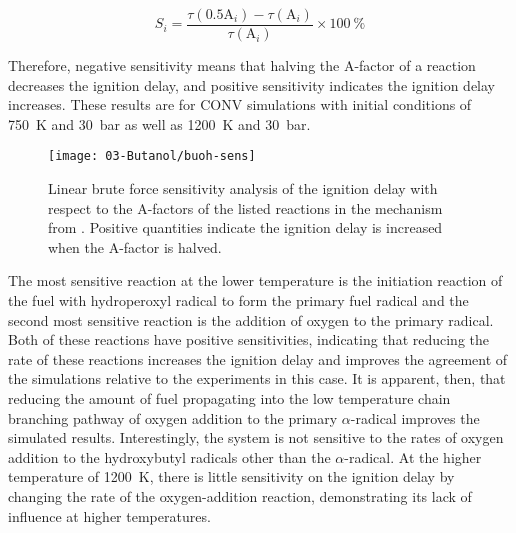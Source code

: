\documentclass[../main.tex]{subfiles}
\begin{document}
\begin{equation}
    \label{eq:buoh-sens}
    S_i=\frac{\tau(0.5\mathrm{A}_i )-\tau(\mathrm{A}_i )}{\tau(\mathrm{A}_i)} \times \SI{100}{\percent}
\end{equation}

Therefore, negative sensitivity means that halving the $\mathrm{A}$-factor of a reaction
decreases the ignition delay, and positive sensitivity indicates the ignition
delay increases. These results are for CONV simulations with initial conditions
of \SI{750}{\kelvin} and \SI{30}{\bar} as well as \SI{1200}{\kelvin} and \SI{30}{\bar}.

\begin{figure}
    \texttt{[image: 03-Butanol/buoh-sens]}
    \caption{Linear brute force sensitivity analysis of the ignition delay with
        respect to the A-factors of the listed reactions in the mechanism from
        \textcite{Sarathy2012}. Positive quantities indicate the ignition delay
        is increased when the $\mathrm{A}$-factor is halved.}
    \label{fig:buoh-sens}
\end{figure}

The most sensitive reaction at the lower temperature is the initiation reaction
of the fuel with hydroperoxyl radical to form the primary fuel radical and the
second most sensitive reaction is the addition of oxygen to the primary
radical. Both of these reactions have positive sensitivities, indicating that
reducing the rate of these reactions increases the ignition delay
and improves the agreement of the simulations relative to the experiments
in this case. It is apparent, then, that reducing the amount of fuel
propagating into the low temperature chain branching pathway of oxygen
addition to the primary $\alpha$-radical improves the simulated results.
Interestingly, the \iBuOH{} system is not sensitive to the rates of
oxygen addition to the hydroxybutyl radicals other than the
$\alpha$-radical. At the higher temperature of \SI{1200}{\kelvin}, there
is little sensitivity on the ignition delay by changing the rate of the
oxygen-addition reaction, demonstrating its lack of influence at higher
temperatures.
\end{document}
